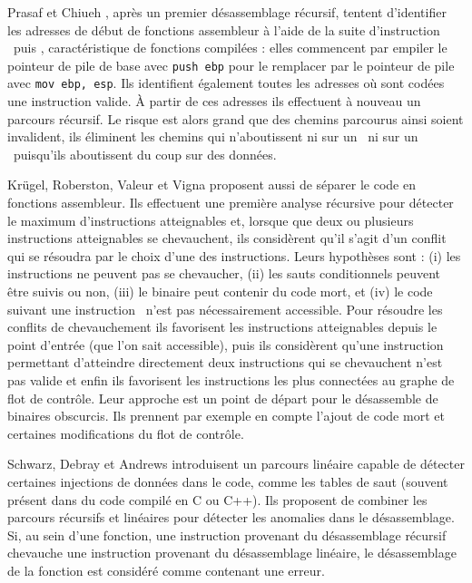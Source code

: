 Prasaf et Chiueh \cite{PC03}, après un premier désassemblage récursif, tentent d'identifier les adresses de début de fonctions assembleur à l'aide de la suite d'instruction \push\ puis \mov, caractéristique de fonctions compilées : elles commencent par empiler le pointeur de pile de base avec \texttt{push ebp} pour le remplacer par le pointeur de pile avec \texttt{mov ebp, esp}. Ils identifient également toutes les adresses où sont codées une instruction valide. À partir de ces adresses ils effectuent à nouveau un parcours récursif. Le risque est alors grand que des chemins parcourus ainsi soient invalident, ils éliminent les chemins qui n'aboutissent ni sur un \ret\ ni sur un \jmp\ puisqu'ils aboutissent du coup sur des données.





Krügel, Roberston, Valeur et Vigna \cite{KruegelRVV04} proposent aussi de séparer le code en fonctions assembleur. Ils effectuent une première analyse récursive pour détecter le maximum d'instructions atteignables et, lorsque que deux ou plusieurs instructions atteignables se chevauchent, ils considèrent qu'il s'agit d'un conflit qui se résoudra par le choix d'une des instructions.
Leurs hypothèses sont : (i) les instructions ne peuvent pas se chevaucher, (ii) les sauts conditionnels peuvent être suivis ou non, (iii) le binaire peut contenir du code mort, et (iv) le code suivant une instruction \call\ n'est pas nécessairement accessible. Pour résoudre les conflits de chevauchement ils favorisent les instructions atteignables depuis le point d'entrée (que l'on sait accessible), puis ils considèrent qu'une instruction permettant d'atteindre directement deux instructions qui se chevauchent n'est pas valide et enfin ils favorisent les instructions les plus connectées au graphe de flot de contrôle.
Leur approche est un point de départ pour le désassemble de binaires obscurcis. Ils prennent par exemple en compte l'ajout de code mort et certaines modifications du flot de contrôle.

Schwarz, Debray et Andrews \cite{SDA02} introduisent un parcours linéaire capable de détecter certaines injections de données dans le code, comme les tables de saut (souvent présent dans du code compilé en C ou C++). Ils proposent de combiner les parcours récursifs et linéaires pour détecter les anomalies dans le désassemblage. Si, au sein d'une fonction, une instruction provenant du désassemblage récursif chevauche une instruction provenant du désassemblage linéaire, le désassemblage de la fonction est considéré comme contenant une erreur.
\\

